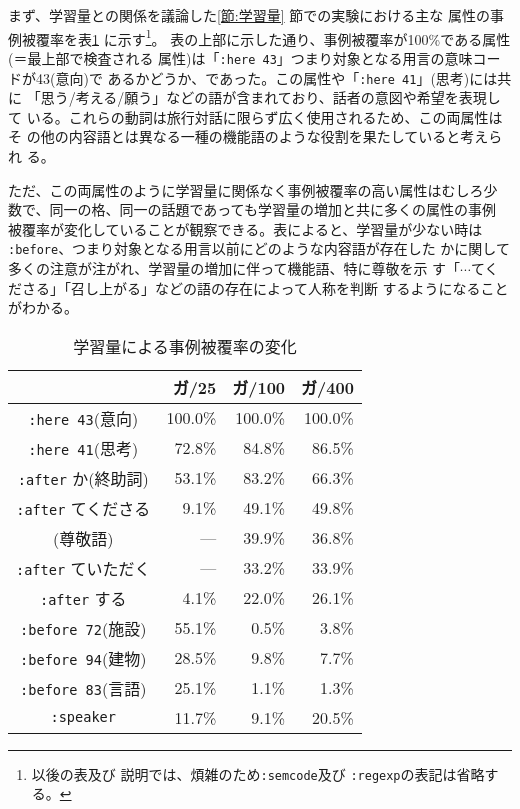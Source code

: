 まず、学習量との関係を議論した{}\ref{節:学習量} 節での実験における主な
属性の事例被覆率を表{}\ref{事例被覆率/が} に示す\footnote{以後の表及び
説明では、煩雑のため\verb+:semcode+及び \verb+:regexp+の表記は省略する。}。
表の上部に示した通り、事例被覆率が100\%である属性(＝最上部で検査される
属性)は「\verb+:here 43+」つまり対象となる用言の意味コードが43(意向)で
あるかどうか、であった。この属性や「\verb+:here 41+」(思考)には共に
「思う/考える/願う」などの語が含まれており、話者の意図や希望を表現して
いる。これらの動詞は旅行対話に限らず広く使用されるため、この両属性はそ
の他の内容語とは異なる一種の機能語のような役割を果たしていると考えられ
る。

ただ、この両属性のように学習量に関係なく事例被覆率の高い属性はむしろ少
数で、同一の格、同一の話題であっても学習量の増加と共に多くの属性の事例
被覆率が変化していることが観察できる。表によると、学習量が少ない時は 
{}\verb+:before+、つまり対象となる用言以前にどのような内容語が存在した
かに関して多くの注意が注がれ、学習量の増加に伴って機能語、特に尊敬を示
す「$\cdots$てくださる」「召し上がる」などの語の存在によって人称を判断
するようになることがわかる。


\begin{table}
\begin{center}
\caption{学習量による事例被覆率の変化}
\label{事例被覆率/が}
\begin{tabular}{c|*{3}{r}}
\hline\hline
                    & ガ/25& ガ/100& ガ/400\\
\hline
\verb+:here 43+(意向)    &100.0\% &100.0\% &100.0\% \\
\verb+:here 41+(思考)    & 72.8\% & 84.8\% & 86.5\% \\
\verb+:after+ か(終助詞)& 53.1\% & 83.2\% & 66.3\% \\
\hline
\verb+:after+ てくださる   & 9.1\% & 49.1\% & 49.8\% \\
(尊敬語)             & --- & 39.9\% & 36.8\% \\
\verb+:after+ ていただく   & --- & 33.2\% & 33.9\% \\
\verb+:after+ する         & 4.1\% & 22.0\% & 26.1\% \\
\hline
\verb+:before 72+(施設)& 55.1\% & 0.5\% & 3.8\% \\
\verb+:before 94+(建物)& 28.5\% & 9.8\% & 7.7\% \\
\verb+:before 83+(言語)& 25.1\% & 1.1\% & 1.3\% \\
\hline
\verb+:speaker+        & 11.7\% & 9.1\% & 20.5\% \\
\hline
\end{tabular}
\end{center}
\end{table}


